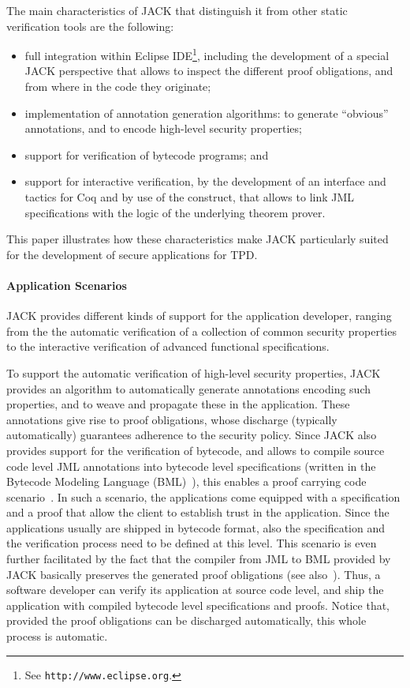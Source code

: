 The main characteristics of JACK that distinguish it from other static
verification tools are the following:
\begin{itemize}
\item full integration within Eclipse IDE\footnote{See
\texttt{http://www.eclipse.org}.}, including the development of a
special JACK perspective that allows to inspect the different proof
obligations, and from where in the code they originate;
\item implementation of annotation generation algorithms: to
generate ``obvious'' annotations, and to encode high-level security
properties;
\item support for verification of bytecode programs; and
\item support for interactive verification, by the development of an interface
and tactics for Coq and by use of the \native construct, that allows to
link JML specifications with the logic of the underlying theorem
prover. 
\end{itemize}
This paper illustrates how these characteristics make JACK
particularly suited for the development of secure applications for
TPD.

\paragraph{Application Scenarios}
JACK provides different kinds of support for the application
developer, ranging from the the automatic verification of a collection
of common security properties to the interactive verification of
advanced functional specifications.

To support the automatic verification of high-level security
properties, JACK provides an algorithm to automatically generate
annotations encoding such properties, and to weave and propagate these
in the application. These annotations give rise to proof obligations,
whose discharge (typically automatically) guarantees adherence to the
security policy. Since JACK also provides support for the verification
of bytecode, and allows to compile source code level JML annotations
into bytecode level specifications (written in the Bytecode Modeling
Language (BML)~\cite{BurdyHP07}), this enables a proof carrying code
scenario~\cite{Necula97}. In such a scenario, the applications come
equipped with a specification and a proof that allow the client to
establish trust in the application. Since the applications usually are
shipped in bytecode format, also the specification and the
verification process need to be defined at this level. This scenario
is even further facilitated by the fact that the compiler from JML to
BML provided by JACK basically preserves the generated proof
obligations (see also~\cite{gta05:fast}). Thus, a software developer
can verify its application at source code level, and ship the
application with compiled bytecode level specifications and
proofs. Notice that, provided the proof obligations can be discharged
automatically, this whole process is automatic.

